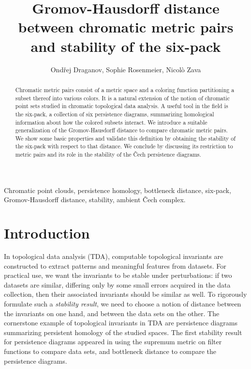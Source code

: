 \documentclass[8pt,a4paper,oneside,english,english]{article}
\author{Ond\v{r}ej Draganov, Sophie Rosenmeier, Nicol\`o Zava}
\title{Gromov-Hausdorff distance between chromatic metric pairs and stability of the six-pack}
\date{}
\theoremstyle{plain}
\theoremstyle
{plain}
\theoremstyle{definition}
\begin{document}
\maketitle

\begin{abstract}
Chromatic metric pairs consist of a metric space and a coloring function partitioning a subset thereof into various colors. 
It is a natural extension of the notion of chromatic point sets studied in chromatic topological data analysis.
A useful tool in the field is the six-pack, a collection of six persistence diagrams, summarizing homological information about how the colored subsets interact.
We introduce a suitable generalization of the Gromov-Hausdorff distance to compare chromatic metric pairs. We show some basic properties and validate this definition by obtaining the stability of the six-pack with respect to that distance.
We conclude by discussing its restriction to metric pairs and its role in the stability of the \v{C}ech persistence diagrams.
\end{abstract}

 Chromatic point clouds, persistence homology, bottleneck distance, six-pack, Gromov-Hausdorff distance, stability, ambient \v{C}ech complex.

\tableofcontents

\section{Introduction}

In topological data analysis (TDA), computable topological invariants are constructed to extract patterns and meaningful features from datasets.
For practical use, we want the invariants to be stable under perturbations: 
if two datasets are similar, differing only by some small errors acquired in the data collection, then their associated invariants should be similar as well.
To rigorously formulate such a \emph{stability result}, we need to choose a notion of distance between the invariants on one hand, and between the data sets on the other.  
The cornerstone example of topological invariants in TDA are persistence diagrams summarizing persistent homology of the studied spaces.
The first stability result for persistence diagrams appeared in \cite{Coh-SteEdeHar} using the supremum metric on filter functions to compare data sets, and bottleneck distance to compare the persistence diagrams.
\end{document}
